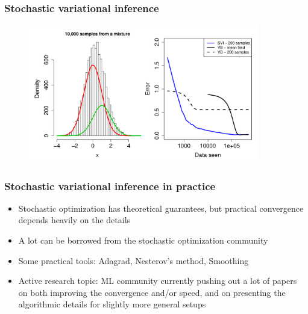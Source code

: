 \documentclass{beamer}
\begin{document}
\begin{frame}
  \frametitle{Stochastic variational inference}

  \begin{figure}
  \begin{center}
  \includegraphics[width=0.9\textwidth]{mixture3.pdf}
  \end{center}
  \end{figure}

\end{frame}

\begin{frame}
  \frametitle{Stochastic variational inference in practice}

  \begin{itemize}
  \item Stochastic optimization has theoretical guarantees, but
    practical convergence depends heavily on the details
  \item A lot can be borrowed from the stochastic optimization community
  \item Some practical tools: Adagrad, Nesterov's method, Smoothing
  \item Active research topic: ML community currently pushing out
    a lot of papers on both improving the convergence and/or speed,
    and on presenting the algorithmic details for slightly more general setups
  \end{itemize}
\end{frame}




\end{document}
